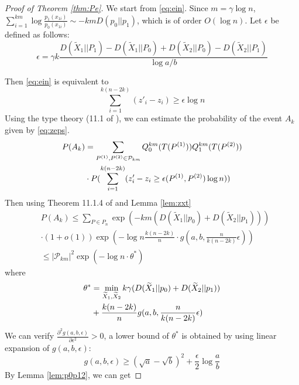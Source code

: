 \documentclass[conference]{IEEEtran}
\begin{document}
\begin{proof}[Proof of Theorem \ref{thm:Pe}]
We start from \eqref{eq:ein}.
Since $m=\gamma \log n$, $\sum_{i=1}^{km} \log \frac{p_1(x_{1i})}{p_0(x_{1i})} \sim
-km D(p_0 || p_1)$, which is of order $O(\log n)$.
Let $\epsilon$ be defined as follows:
\begin{equation}
\epsilon = \gamma k\frac{D(\widetilde{X}_1 || P_1) - D(\widetilde{X}_1 || P_0) + D(\widetilde{X}_2 || P_0) - D(\widetilde{X}_2 || P_1)}{\log a /b}
\end{equation}

Then \eqref{eq:ein} is equivalent to
\begin{equation}\label{eq:zeps}
\sum_{i=1}^{k(n-2k)}(z'_{i} - z_{i}) \geq \epsilon \log n
\end{equation}
Using the type theory (11.1 of \cite{cover1999elements}), we can estimate the probability of the event $A_k$ given by \eqref{eq:zeps}.
\begin{align}
P(A_k) & =  \sum_{P^{(1)},P^{(2)}\in \mathcal{P}_{km}} Q_0^{km}(T(P^{(1)}))Q_1^{km}(T(P^{(2)}))\notag \\
& \cdot P(\sum_{i=1}^{k(n-2k)} (z'_{i} - z_{i} \geq \epsilon(P^{(1)}, P^{(2)})  \log n ))\label{eq:decomp} \\
\end{align}
Then using Theorem 11.1.4 of \cite{cover1999elements} and Lemma \ref{lem:zxt} 
\begin{align*}
&P(A_k)  \leq \sum_{P \in P_n} \exp(-km (D(\widetilde{X}_1 || p_0) + D(\widetilde{X}_2 || p_1))) \\
& \cdot (1+o(1))\exp(-\log n \frac{k(n-2k)}{n}\cdot g(a, b, \frac{n}{k(n-2k)}\epsilon) ) \\
&\leq |\mathcal{P}_{km}|^2 \exp(-\log n \cdot \theta^*) 
\end{align*}
where
\begin{align}
\theta^* &= \min_{\widetilde{X}_1,\widetilde{X}_2} k\gamma (D(\widetilde{X}_1|| p_0) + D(\widetilde{X}_2 || p_1)) \notag \\
& + \frac{k(n-2k)}{n} g(a,b, \frac{n}{k(n-2k)}\epsilon) \label{eq:theta_star}
\end{align}
We can verify $\frac{\partial^2 g(a,b,\epsilon)}{\partial \epsilon^2} > 0$,
a lower bound of $\theta^*$ is obtained by using linear expansion of $g(a,b, \epsilon)$:
\begin{equation*}
g(a,b,\epsilon) \geq  (\sqrt{a} - \sqrt{b})^2 + \frac{\epsilon}{2}\log \frac{a}{b} 
\end{equation*}
By Lemma \ref{lem:p0p12}, we can get

\end{proof}
\end{document}

